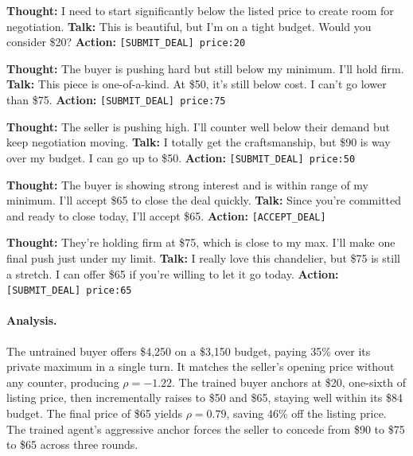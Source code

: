 \documentclass[11pt]{article}
\begin{document}
\begin{buyerbox}
\textbf{Thought:} I need to start significantly below the listed price to create room for negotiation.\newline
\textbf{Talk:} This is beautiful, but I'm on a tight budget. Would you consider \$20?\newline
\textbf{Action:} \texttt{[SUBMIT\_DEAL] price:20}
\end{buyerbox}

\begin{sellerbox}
\textbf{Thought:} The buyer is pushing hard but still below my minimum. I'll hold firm.\newline
\textbf{Talk:} This piece is one-of-a-kind. At \$50, it's still below cost. I can't go lower than \$75.\newline
\textbf{Action:} \texttt{[SUBMIT\_DEAL] price:75}
\end{sellerbox}

\begin{buyerbox}
\textbf{Thought:} The seller is pushing high. I'll counter well below their demand but keep negotiation moving.\newline
\textbf{Talk:} I totally get the craftsmanship, but \$90 is way over my budget. I can go up to \$50.\newline
\textbf{Action:} \texttt{[SUBMIT\_DEAL] price:50}
\end{buyerbox}

\begin{sellerbox}
\textbf{Thought:} The buyer is showing strong interest and is within range of my minimum. I'll accept \$65 to close the deal quickly.\newline
\textbf{Talk:} Since you're committed and ready to close today, I'll accept \$65.\newline
\textbf{Action:} \texttt{[ACCEPT\_DEAL]}
\end{sellerbox}

\begin{buyerbox}
\textbf{Thought:} They're holding firm at \$75, which is close to my max. I'll make one final push just under my limit.\newline
\textbf{Talk:} I really love this chandelier, but \$75 is still a stretch. I can offer \$65 if you're willing to let it go today.\newline
\textbf{Action:} \texttt{[SUBMIT\_DEAL] price:65}
\end{buyerbox}

\paragraph{Analysis.} The untrained buyer offers \$4{,}250 on a \$3{,}150 budget, paying 35\% over its private maximum in a single turn. It matches the seller's opening price without any counter, producing $\rho = -1.22$. The trained buyer anchors at \$20, one-sixth of listing price, then incrementally raises to \$50 and \$65, staying well within its \$84 budget. The final price of \$65 yields $\rho = 0.79$, saving 46\% off the listing price. The trained agent's aggressive anchor forces the seller to concede from \$90 to \$75 to \$65 across three rounds.
\end{document}
